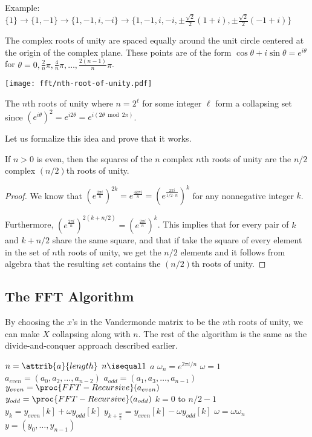 Example: $\{1\} \to \{1,-1\} \to \{1,-1,i,-i\} \to \{1,-1,i,-i,\pm \frac{\sqrt{2}}{2}(1+i),\pm \frac{\sqrt{2}}{2}(-1+i) \}$

The complex roots of unity are spaced equally around the unit circle centered at the origin of the complex plane. These points are of the form $\cos\theta + i\sin\theta = e^{i\theta}$ for $\theta = 0,\frac{2}{n}\pi,\frac{4}{n}\pi,\ldots,\frac{2(n-1)}{n}\pi$. 

\begin{center}
    \texttt{[image: fft/nth-root-of-unity.pdf]}
\end{center}

The $n$th roots of unity where $n=2^\ell$ for some integer $\ell$ form a collapsing set since $(e^{i\theta})^2 = e^{i 2\theta} = e^{i(2\theta \bmod 2\pi)}$. 

Let us formalize this idea and prove that it works.

\begin{lemma}
    If $n>0$ is even, then the squares of the $n$ complex $n$th roots of unity are the $n/2$ complex $(n/2)$th roots of unity. 
\end{lemma}

\begin{proof}
    We know that $\left(e^{\frac{2\pi i}{n}}\right)^{2k} = e^{\frac{4k\pi i}{n}} = \left(e^{\frac{2\pi i}{1/2 \cdot n}}\right)^k$ for any nonnegative integer $k$. 
    
    Furthermore, $\left(e^{\frac{2\pi i}{n}}\right)^{2(k+n/2)} = \left(e^{\frac{2\pi i}{n}}\right)^{k}$. This implies that for every pair of $k$ and $k+n/2$ share the same square, and that if take the square of every element in the set of $n$th roots of unity, we get the $n/2$ elements and it follows from algebra that the resulting set contains the $(n/2)$th roots of unity.
\end{proof}

\subsection{The FFT Algorithm}

By choosing the $x$'s in the Vandermonde matrix to be the $n$th roots of unity, we can make $X$ collapsing along with $n$. The rest of the algorithm is the same as the divide-and-conquer approach described earlier.

\begin{codebox}
    \li $n = \attrib{a}{length}$
    \li \If $n \isequal 1$ \Then
        \li \Return $a$ 
    \End
    \li $\omega_n = e^{2\pi i/n}$
    \li $\omega = 1$
    \li $a_{even} = (a_0,a_2,\ldots,a_{n-2})$
    \li $a_{odd} = (a_1,a_3,\ldots,a_{n-1})$
    \li $y_{even} = \proc{FFT-Recursive}(a_{even})$
    \li $y_{odd} = \proc{FFT-Recursive}(a_{odd})$
    \li \For $k = 0$ to $n/2 - 1$ \Do
        \li $y_k = y_{even}[k] + \omega y_{odd}[k]$
        \li $y_{k+\frac{n}{2}} = y_{even}[k] - \omega y_{odd}[k]$
        \li $\omega = \omega \omega_n$
    \End
    \li \Return $y = (y_0,\ldots,y_{n-1})$      
\end{codebox}

